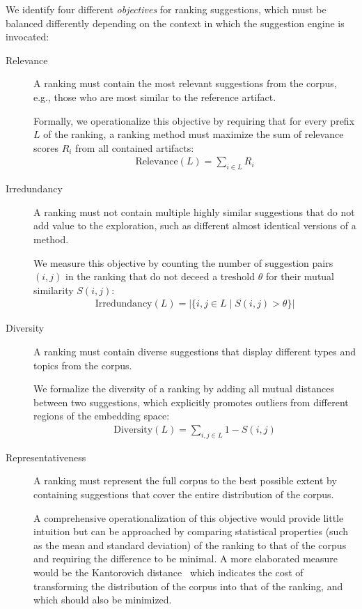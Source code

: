 We identify four different \emph{objectives} for ranking suggestions, which must be balanced differently depending on the context in which the suggestion engine is invocated:

\begin{description}
	\item[Relevance]
	A ranking must contain the most relevant suggestions from the corpus, e.g., those who are most similar to the reference artifact.

	Formally, we operationalize this objective by requiring that for every prefix $L$ of the ranking, a ranking method must maximize the sum of relevance scores $R_i$ from all contained artifacts:
	\begin{align}
		\text{Relevance}(L) = \sum_{i \in L} R_i
	\end{align}

	\item[Irredundancy]
	A ranking must not contain multiple highly similar suggestions that do not add value to the exploration, such as different almost identical versions of a method.

	We measure this objective by counting the number of suggestion pairs $(i, j)$ in the ranking that do not deceed a treshold $\theta$ for their mutual similarity $S(i, j)$:
	\begin{align}
		\text{Irredundancy}(L) = | \{ i, j \in L \mid S(i, j) > \theta \} |
	\end{align}

	\item[Diversity]
	A ranking must contain diverse suggestions that display different types and topics from the corpus.

	We formalize the diversity of a ranking by adding all mutual distances between two suggestions, which explicitly promotes outliers from different regions of the embedding space:
	\begin{align}
		\text{Diversity}(L) = \sum_{i, j \in L} 1 - S(i, j)
	\end{align}

	\item[Representativeness]
	A ranking must represent the full corpus to the best possible extent by containing suggestions that cover the entire distribution of the corpus.

	A comprehensive operationalization of this objective would provide little intuition but can be approached by comparing statistical properties (such as the mean and standard deviation) of the ranking to that of the corpus and requiring the difference to be minimal.
	A more elaborated measure would be the Kantorovich distance~\cite{vaserstein1969markov} which indicates the cost of transforming the distribution of the corpus into that of the ranking, and which should also be minimized.
\end{description}

